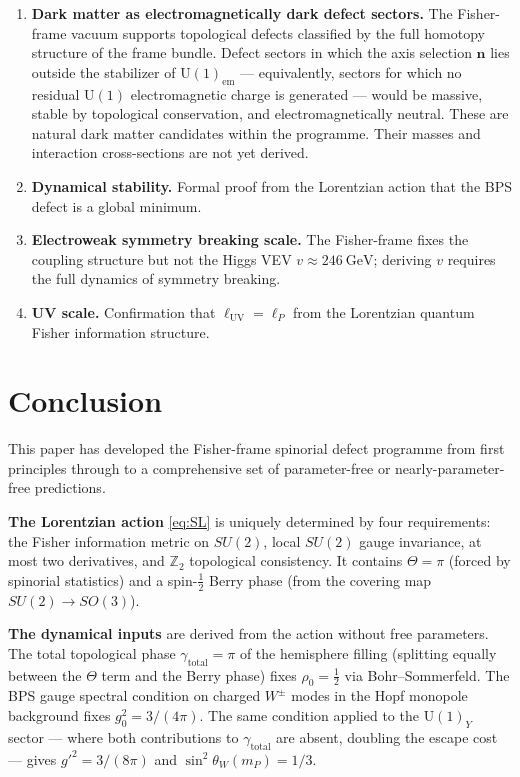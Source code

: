 \documentclass[12pt]{article}
\theoremstyle{definition}
\theoremstyle{remark}
\begin{document}
\begin{enumerate}
\item \textbf{Dark matter as electromagnetically dark defect sectors.}
  The Fisher-frame vacuum supports topological defects classified by the full
  homotopy structure of the frame bundle.  Defect sectors in which the axis
  selection $\mathbf{n}$ lies outside the stabilizer of $\mathrm{U}(1)_{\mathrm{em}}$
  --- equivalently, sectors for which no residual $\mathrm{U}(1)$
  electromagnetic charge is generated --- would be massive, stable by
  topological conservation, and electromagnetically neutral.  These are
  natural dark matter candidates within the programme.  Their masses and
  interaction cross-sections are not yet derived.

\item \textbf{Dynamical stability.}  Formal proof from the Lorentzian action
  that the BPS defect is a global minimum.

\item \textbf{Electroweak symmetry breaking scale.}  The Fisher-frame fixes
  the coupling structure but not the Higgs VEV $v\approx 246\ \mathrm{GeV}$;
  deriving $v$ requires the full dynamics of symmetry breaking.

\item \textbf{UV scale.}  Confirmation that $\ell_{\mathrm{UV}}=\ell_P$ from
  the Lorentzian quantum Fisher information structure.
\end{enumerate}

\section{Conclusion}
\label{sec:conclusion}

This paper has developed the Fisher-frame spinorial defect programme from
first principles through to a comprehensive set of parameter-free or
nearly-parameter-free predictions.

\textbf{The Lorentzian action} \eqref{eq:SL} is uniquely determined by
four requirements: the Fisher information metric on $SU(2)$, local $SU(2)$
gauge invariance, at most two derivatives, and $\mathbb{Z}_2$ topological
consistency.  It contains $\Theta=\pi$ (forced by spinorial statistics) and
a spin-$\tfrac{1}{2}$ Berry phase (from the covering map $SU(2)\to SO(3)$).

\textbf{The dynamical inputs} are derived from the action without free
parameters.  The total topological phase $\gamma_{\mathrm{total}}=\pi$
of the hemisphere filling (splitting equally between the $\Theta$ term and
the Berry phase) fixes $\rho_0=\tfrac{1}{2}$ via Bohr--Sommerfeld.
The BPS gauge spectral condition on charged $W^\pm$ modes in the Hopf
monopole background fixes $g_0^2=3/(4\pi)$.  The same condition applied
to the $\mathrm{U}(1)_Y$ sector — where both contributions to
$\gamma_{\mathrm{total}}$ are absent, doubling the escape cost — gives
$g'^2=3/(8\pi)$ and $\sin^2\theta_W(m_P)=1/3$.
\end{document}
